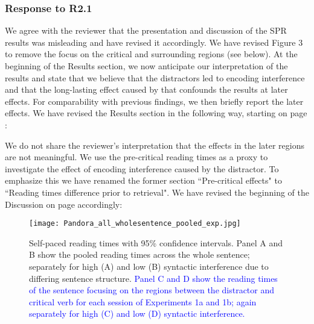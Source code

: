 \documentclass[12pt]{article}
\begin{document}
\subsubsection*{Response to R2.1}
We agree with the reviewer that the presentation and discussion of the SPR results was misleading and have revised it accordingly. We have revised Figure 3 to remove the focus on the critical and surrounding regions (see below). At the beginning of the Results section, we now anticipate our interpretation of the results and state that we believe that the distractors led to encoding interference and that the long-lasting effect caused by that confounds the results at later effects. For comparability with previous findings, we then briefly report the later effects. We have revised the Results section in the following way, starting on page \pageref{revised_SPR}: 

\begin{quote}
\end{quote}

We do not share the reviewer's interpretation that the effects in the later regions are not meaningful. We use the pre-critical reading times as a proxy to investigate the effect of encoding interference caused by the distractor. To emphasize this we have renamed the former section ``Pre-critical effects" to ``Reading times difference prior to retrieval". We have revised the beginning of the Discussion on page \pageref{prior_to_retrieval} accordingly: 

\begin{quote}
\end{quote}

\setcounter{figure}{2}

\begin{sidewaysfigure}[h]
    \caption{Self-paced reading times with 95\% confidence intervals. Panel A and B show the pooled reading times across the whole sentence; separately for high (A) and low (B) syntactic interference due to differing sentence structure. \textcolor{blue}{Panel C and D show the reading times of the sentence focusing on the regions between the distractor and critical verb for each session of Experiments 1a and 1b; again separately for high (C) and low (D) syntactic interference.}}
    \label{fig:whole_sentence}
    \centering
    \texttt{[image: Pandora\_all\_wholesentence\_pooled\_exp.jpg]}
\end{sidewaysfigure}
\clearpage
\end{document}
